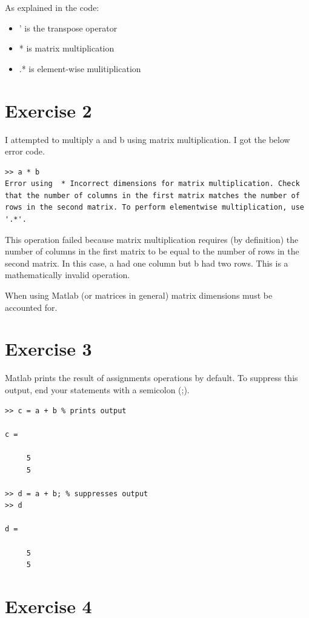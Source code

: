 \documentclass[11pt]{article}
\begin{document}
As explained in the code:
\begin{itemize}
  \item ' is the transpose operator
  \item * is matrix multiplication
  \item .* is element-wise mulitiplication
\end{itemize}

\section{Exercise 2}

I attempted to multiply a and b using matrix multiplication. I got the below error code.

\begin{lstlisting}
>> a * b
Error using  * Incorrect dimensions for matrix multiplication. Check that the number of columns in the first matrix matches the number of rows in the second matrix. To perform elementwise multiplication, use '.*'.
\end{lstlisting}

This operation failed because matrix multiplication requires (by definition) the number of columns in the first matrix to be equal to the number of rows in the second matrix. In this case, a had one column but b had two rows. This is a mathematically invalid operation.

When using Matlab (or matrices in general) matrix dimensions must be accounted for.

\section{Exercise 3}

Matlab prints the result of assignments operations by default. To suppress this output, end your statements with a semicolon (;).

\begin{lstlisting}
>> c = a + b % prints output

c =

     5
     5

>> d = a + b; % suppresses output
>> d

d =

     5
     5

\end{lstlisting}

\section{Exercise 4}
\end{document}
